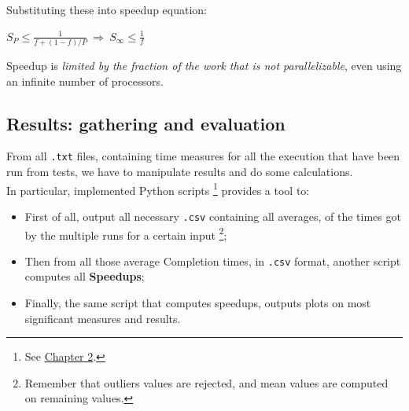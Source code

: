 Substituting these into speedup equation:
\begin{center}
	\(S_{P} \leq \frac{1}{f+(1-f)/P}\  \Rightarrow \  S_{\infty} \leq \frac{1}{f}\)
\end{center}

Speedup is \textit{limited by the fraction of the work that is not parallelizable}, even using an infinite number of processors\cite{structparprog}.\\


\subsection{Results: gathering and evaluation}
\label{subs:resgath}
From all \texttt{.txt} files, containing time measures for all the execution that have been run from tests, we have to manipulate results and do some calculations.\\
In particular, implemented Python scripts \footnote{See \hyperref[chap:tools]{Chapter 2}.} provides a tool to:
\begin{itemize}
	\item First of all, output all necessary \texttt{.csv} containing all averages, of the times got by the multiple runs for a certain input \footnote{Remember that outliers values are rejected, and mean values are computed on remaining values.};
	\item Then from all those average Completion times, in \texttt{.csv} format, another script computes all \textbf{Speedups};
	\item Finally, the same script that computes speedups, outputs plots on most significant measures and results.\\
\end{itemize}


